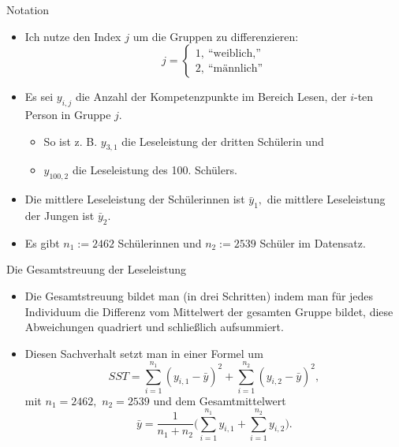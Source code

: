 \documentclass[usenames,dvipsnames,handout]{beamer}
\begin{document}
\begin{frame}{Notation}
\begin{itemize}
\item{Ich nutze den Index $j$ um die Gruppen zu differenzieren:
     \[
     j=\left\{\begin{array}{ll} 1, \: \text{``weiblich,''} \\
        2, \:  \text{``männlich''}\end{array}\right. 
  \]

}
\item{Es sei $y_{i,j}$ die Anzahl der Kompetenzpunkte im Bereich Lesen, der $i$-ten Person in Gruppe $j.$
\begin{itemize}
\item{So ist z. B. $y_{3,1}$ die Leseleistung der dritten Schülerin und}\pause
\item{$y_{100,2}$ die Leseleistung des 100. Schülers.}\pause
\end{itemize}
}\pause
\item{Die mittlere Leseleistung der Schülerinnen ist $\bar{y}_{1},$
die mittlere Leseleistung der Jungen ist $\bar{y}_{2}.$ }\pause
\item{Es gibt $n_{1}:=2462$ Schülerinnen und  $n_{2}:=2539$ Schüler im Datensatz.}
\end{itemize}
\end{frame}


\begin{frame}{Die Gesamtstreuung der Leseleistung}
\begin{itemize}
\item{Die Gesamtstreuung bildet man (in drei Schritten) indem man für jedes Individuum die Differenz
vom Mittelwert der gesamten Gruppe bildet, diese Abweichungen quadriert und schließlich aufsummiert.}
\item{Diesen Sachverhalt setzt man in einer Formel um
\begin{equation}
\label{sos_f}
SST=\sum_{i=1}^{n_{1}} (y_{i,1}-\bar{y})^{2} +\sum_{i=1}^{n_{2}} (y_{i,2}-\bar{y})^{2},
 \end{equation}
 mit $n_{1}=2462,$ $n_{2}=2539$ und dem Gesamtmittelwert 
 $$\bar{y}=\frac{1}{n_{1}+n_{2}} \bigg(\sum_{i=1}^{n_{1}} y_{i,1} + \sum_{i=1}^{n_{2}} y_{i,2}\bigg).$$
}
\end{itemize}
\end{frame}
\end{document}
